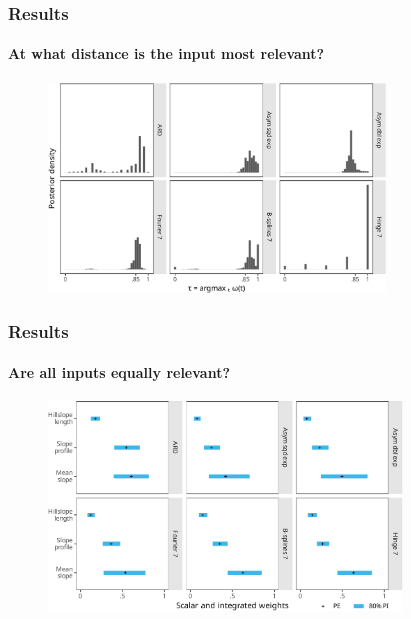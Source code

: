 \documentclass{snedecorbeamer}
\begin{document}
\begin{frame}
  \frametitle{Results}
  \framesubtitle{At what distance is the input most relevant?}

  \begin{figure}
    \centering
    \includegraphics[height=15em]{inc/wepp_weight_argmax_tiny_fsc140.pdf}
  \end{figure}

\end{frame}

\begin{frame}
  \frametitle{Results}
  \framesubtitle{Are all inputs equally relevant?}

  \begin{figure}
    \centering
    \includegraphics[height=15em]{inc/wepp_weight_integral_tiny_fsc140.pdf}
  \end{figure}

\end{frame}
\end{document}
